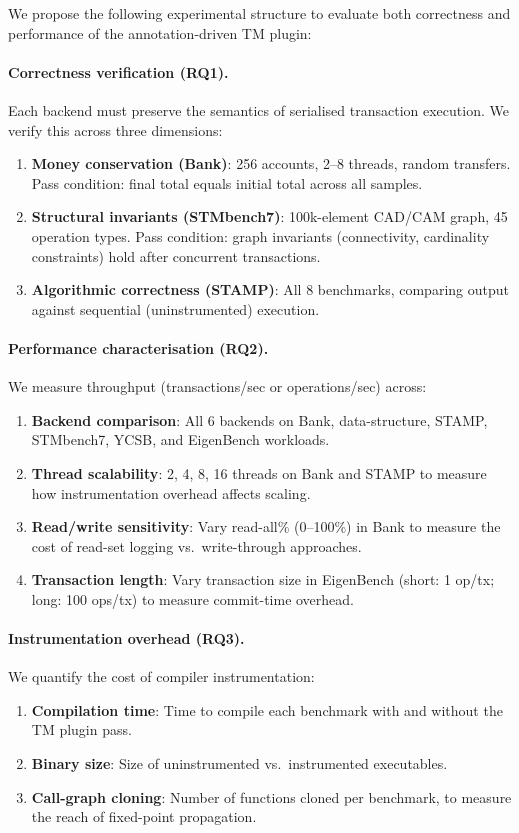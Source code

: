 \documentclass[article,12pt]{article}
\begin{document}
We propose the following experimental structure to evaluate both correctness
and performance of the annotation-driven TM plugin:

\paragraph{Correctness verification (RQ1).}
Each backend must preserve the semantics of serialised transaction execution.
We verify this across three dimensions:
\begin{enumerate}
\item \textbf{Money conservation (Bank)}: 256 accounts, 2--8 threads,
  random transfers.  Pass condition: final total equals initial total
  across all samples.
\item \textbf{Structural invariants (STMbench7)}: 100k-element CAD/CAM graph,
  45 operation types.  Pass condition: graph invariants (connectivity,
  cardinality constraints) hold after concurrent transactions.
\item \textbf{Algorithmic correctness (STAMP)}: All 8 benchmarks,
  comparing output against sequential (uninstrumented) execution.
\end{enumerate}

\paragraph{Performance characterisation (RQ2).}
We measure throughput (transactions/sec or operations/sec) across:
\begin{enumerate}
\item \textbf{Backend comparison}: All 6 backends on Bank, data-structure,
  STAMP, STMbench7, YCSB, and EigenBench workloads.
\item \textbf{Thread scalability}: 2, 4, 8, 16 threads on Bank and STAMP
  to measure how instrumentation overhead affects scaling.
\item \textbf{Read/write sensitivity}: Vary read-all\% (0--100\%) in Bank
  to measure the cost of read-set logging vs.\ write-through approaches.
\item \textbf{Transaction length}: Vary transaction size in EigenBench
  (short: 1 op/tx; long: 100 ops/tx) to measure commit-time overhead.
\end{enumerate}

\paragraph{Instrumentation overhead (RQ3).}
We quantify the cost of compiler instrumentation:
\begin{enumerate}
\item \textbf{Compilation time}: Time to compile each benchmark with and
  without the TM plugin pass.
\item \textbf{Binary size}: Size of uninstrumented vs.\ instrumented
  executables.
\item \textbf{Call-graph cloning}: Number of functions cloned per
  benchmark, to measure the reach of fixed-point propagation.
\end{enumerate}
\end{document}
